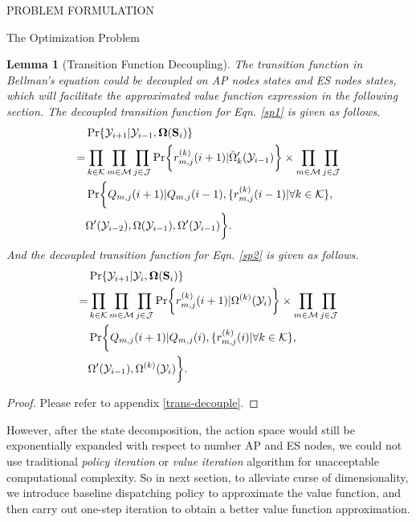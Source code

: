 \documentclass[10pt, conference, letterpaper]{IEEEtran}
\newtheorem{lemma}{Lemma}
\DeclarePairedDelimiter{\set}{\{}{\}}
\DeclarePairedDelimiter{\Brace}{\bigg\{}{\bigg\}}
\newcommand{\apSet}{\mathcal{K}}
\newcommand{\esSet}{\mathcal{M}}
\newcommand{\jSpace}{\mathcal{J}}
\newcommand{\Stat}{\mathbf{S}}
\newcommand{\Obsv}{\mathcal{Y}}
\newcommand{\Policy}{\boldsymbol{\Omega}}
\begin{document}
\begin{section}{PROBLEM FORMULATION}
\begin{subsection}{The Optimization Problem}
            \begin{lemma}[Transition Function Decoupling]
                The transition function in Bellman's equation could be decoupled on AP nodes states and ES nodes states, which will facilitate the approximated value function expression in the following section.
                The decoupled transition function for Eqn. \ref{sp1} is given as follows.
                \begin{align}
                    & \Pr\{\Obsv_{i+1}|\Obsv_{i-1}, \Policy(\Stat_{i})\}
                    \nonumber\\
                    =& \prod_{k\in\apSet}\prod_{m\in\esSet}\prod_{j\in\jSpace}
                            \Pr\Brace{r^{(k)}_{m,j}(i+1)|\tilde{\Omega}'_k(\Obsv_{i-1})}
                            \times \prod_{m\in\esSet}\prod_{j\in\jSpace}
                        \nonumber\\
                        & \Pr\Brace{Q_{m,j}(i+1)|Q_{m,j}(i-1), \set{r^{(k)}_{m,j}(i-1)|\forall k\in\apSet},
                        \nonumber\\
                        & \Omega'(\Obsv_{i-2}), \Omega(\Obsv_{i-1}), \Omega'(\Obsv_{i-1})}.
                \end{align}
                And the decoupled transition function for Eqn. \ref{sp2} is given as follows.
                \begin{align}
                    & \Pr\{\Obsv_{i+1}|\Obsv_{i}, \Policy(\Stat_{i})\}
                    \nonumber\\
                    =& \prod_{k\in\apSet}\prod_{m\in\esSet}\prod_{j\in\jSpace}
                            \Pr\Brace{ r^{(k)}_{m,j}(i+1) | \Omega^{(k)}(\Obsv_i) }
                            \times \prod_{m\in\esSet}\prod_{j\in\jSpace}
                        \nonumber\\
                        & \Pr\Brace{Q_{m,j}(i+1)|Q_{m,j}(i), \set{r^{(k)}_{m,j}(i)|\forall k\in\apSet},
                        \nonumber\\
                        & \Omega'(\Obsv_{i-1}), \Omega^{(k)}(\Obsv_{i})}.
                \end{align}
            \end{lemma}
            \begin{proof}
                Please refer to appendix \ref{trans-decouple}.
            \end{proof}

            However, after the state decomposition, the action space would still be exponentially expanded with respect to number AP and ES nodes, we could not use traditional \emph{policy iteration} or \emph{value iteration} algorithm \cite{sutton1998introduction} for unacceptable computational complexity.
            So in next section, to alleviate curse of dimensionality, we introduce baseline dispatching policy to approximate the value function, and then carry out one-step iteration to obtain a better value function approximation.
        \end{subsection}
    \end{section}
\end{document}
